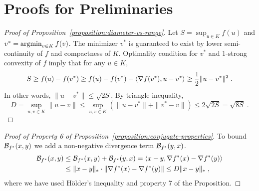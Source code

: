 \section{Proofs for Preliminaries}
\label{section:definitions-proofs}

\begin{proof}[Proof of Proposition~\ref{proposition:diameter-vs-range}]
Let $S = \sup_{u \in K} f(u)$ and $v^* = \operatorname*{argmin}_{v \in K} f(v)$. The minimizer
$v^*$ is guaranteed to exist by lower semi-continuity of $f$ and compactness of
$K$.  Optimality condition for $v^*$ and $1$-strong convexity of $f$ imply that
for any $u \in K$,
$$
S
\ge f(u) - f(v^*)
\ge f(u) - f(v^*) - \langle \nabla f(v^*), u - v^* \rangle
\ge \frac{1}{2}\|u - v^*\|^2 \; .
$$
In other words, $\|u - v^*\| \le \sqrt{2S}$. By triangle inequality,
$$
D = \sup_{u,v \in K} \|u - v\| \le \sup_{u,v \in K} \left( \|u - v^*\| + \|v^ * - v\| \right) \le 2\sqrt{2S} = \sqrt{8S} \; .
$$
\end{proof}

\begin{proof}[Proof of Property 6 of Proposition~\ref{proposition:conjugate-properties}]
To bound $\mathcal{B}_{f^*}(x,y)$ we add a non-negative divergence term
$\mathcal{B}_{f^*}(y,x)$.
\begin{align*}
\mathcal{B}_{f^*}(x, y)
& \le \mathcal{B}_{f^*}(x,y) + \mathcal{B}_{f^*}(y,x)
= \langle x - y, \nabla f^*(x) - \nabla f^*(y) \rangle \\
& \le \|x - y\|_* \cdot \| \nabla f^*(x) - \nabla f^*(y) \|
\le D \|x - y\|_* \; ,
\end{align*}
where we have used H\"older's inequality and property 7 of the Proposition.
\end{proof}


